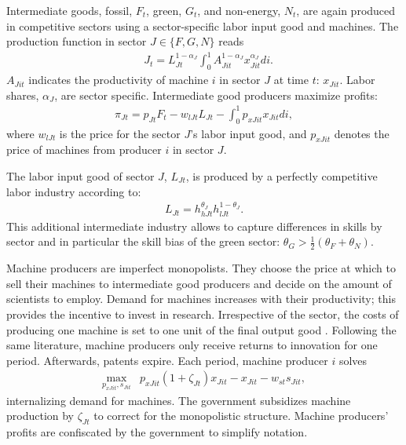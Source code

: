 Intermediate goods, fossil, $F_t$, green, $G_t$, and non-energy, $N_t$, are again produced in competitive sectors using a sector-specific labor input good and machines. The production function in sector $J\in \{F,G,N\}$ reads
\begin{align*}
&J_{t}= L_{Jt}^{1-\alpha_J}\int_{0}^{1}A_{Jit}^{1-\alpha_J}x_{Jit}^{\alpha_J} di.
\end{align*}
$A_{Jit}$ indicates the productivity of machine $i$ in sector $J$ at time $t$: $x_{Jit}$. 
Labor shares, $\alpha_J$, are sector specific. 
Intermediate good producers maximize profits: 
\begin{align*}
\pi_{Jt}=p_{Jt}F_t-w_{lJt}L_{Jt}-\int_{0}^{1}p_{xJit}x_{Jit}di,
\end{align*}
where $w_{lJt}$ is the price for the sector $J$'s labor input good, and $p_{xJit}$ denotes the price of machines from producer $i$ in sector $J$. 

The labor input good of sector $J$, $L_{Jt}$, is produced by a perfectly competitive labor industry according to: 
\begin{align*}
L_{Jt}=h_{hJt}^{\theta_J}h_{lJt}^{1-\theta_J}.
\end{align*}
This additional intermediate industry allows to capture differences in skills by sector and in particular the skill bias of the green sector: $\theta_G>\frac{1}{2}(\theta_F+\theta_N)$. 

Machine producers are imperfect monopolists. They choose the price at which to sell their machines to intermediate good producers and decide on the amount of scientists to employ. Demand for machines increases with their productivity; this provides the incentive to invest in research. Irrespective of the sector, the costs of producing one machine is set to one unit of the final output good \citep[similar to][]{Fried2018ClimateAnalysis, Acemoglu2012TheChange}. 
Following the same literature, machine producers only receive returns to innovation for one period. Afterwards, patents expire. 
Each period, machine producer $i$ solves
\begin{align*}
\underset{p_{xJit}, s_{Jit}}{\max}&p_{xJit}(1+\zeta_{Jt})x_{Jit}-x_{Jit}-w_{st}s_{Jit},
\end{align*}
internalizing demand for machines. 
The government subsidizes machine production by $\zeta_{Jt}$ to correct for the monopolistic structure. Machine producers' profits are confiscated by the government to simplify notation.


